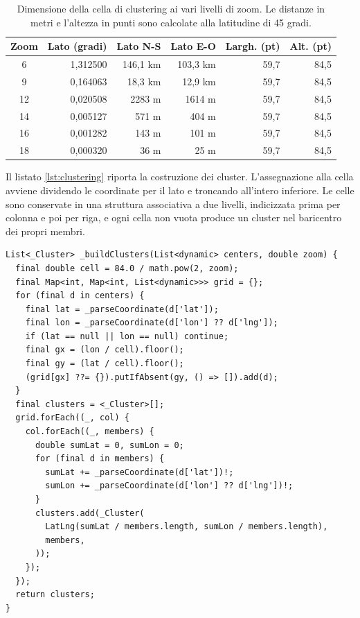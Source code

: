 \begin{table}[H]
\centering
\footnotesize
\begin{tabular}{@{}c r r r r r@{}}
\toprule
\textbf{Zoom} & \textbf{Lato (gradi)} & \textbf{Lato N-S} & \textbf{Lato E-O} & \textbf{Largh. (pt)} & \textbf{Alt. (pt)} \tabularnewline
\midrule
6  & 1,312500  & 146,1 km & 103,3 km & 59,7 & 84,5 \tabularnewline
9  & 0,164063  & 18,3 km  & 12,9 km  & 59,7 & 84,5 \tabularnewline
12 & 0,020508  & 2283 m   & 1614 m   & 59,7 & 84,5 \tabularnewline
14 & 0,005127  & 571 m    & 404 m    & 59,7 & 84,5 \tabularnewline
16 & 0,001282  & 143 m    & 101 m    & 59,7 & 84,5 \tabularnewline
18 & 0,000320  & 36 m     & 25 m     & 59,7 & 84,5 \tabularnewline
\bottomrule
\end{tabular}
\caption{Dimensione della cella di clustering ai vari livelli di zoom. Le distanze in metri e l'altezza in punti sono calcolate
alla latitudine di 45 gradi.}
\label{tab:celle}
\end{table}


Il listato \ref{lst:clustering} riporta la costruzione dei cluster.
L'assegnazione alla cella avviene dividendo le coordinate per il lato e troncando all'intero inferiore.
Le celle sono conservate in una struttura associativa a due livelli, indicizzata prima per colonna e poi per riga, e
ogni cella non vuota produce un cluster nel baricentro dei propri membri.

\begin{listing}[H]
\begin{verbatim}
List<_Cluster> _buildClusters(List<dynamic> centers, double zoom) {
  final double cell = 84.0 / math.pow(2, zoom);
  final Map<int, Map<int, List<dynamic>>> grid = {};
  for (final d in centers) {
    final lat = _parseCoordinate(d['lat']);
    final lon = _parseCoordinate(d['lon'] ?? d['lng']);
    if (lat == null || lon == null) continue;
    final gx = (lon / cell).floor();
    final gy = (lat / cell).floor();
    (grid[gx] ??= {}).putIfAbsent(gy, () => []).add(d);
  }
  final clusters = <_Cluster>[];
  grid.forEach((_, col) {
    col.forEach((_, members) {
      double sumLat = 0, sumLon = 0;
      for (final d in members) {
        sumLat += _parseCoordinate(d['lat'])!;
        sumLon += _parseCoordinate(d['lon'] ?? d['lng'])!;
      }
      clusters.add(_Cluster(
        LatLng(sumLat / members.length, sumLon / members.length),
        members,
      ));
    });
  });
  return clusters;
}
\end{verbatim}
\caption{Costruzione dei cluster a griglia dipendente dallo zoom.}
\label{lst:clustering}
\end{listing}

